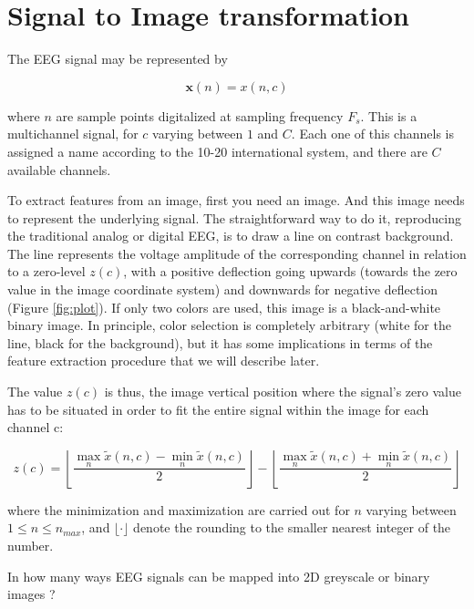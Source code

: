 \section{Signal to Image transformation}

The EEG signal may be represented by

\begin{equation}
\mathbf{x}(n) = x(n,c)
\label{eq:zerolevel}
\end{equation}

\noindent where $n$ are sample points digitalized at sampling frequency $F_s$.  This is a multichannel signal, for $c$ varying between $1$ and $C$.  Each one of this channels is assigned a name according to the 10-20 international system, and there are $C$ available channels.
 
To extract features from an image, first you need an image.  And this image needs to represent the underlying signal.  The straightforward way to do it, reproducing the traditional analog or digital EEG, is to draw a line on contrast background.  The line represents the voltage amplitude of the corresponding channel in relation to a zero-level $z(c)$, with a positive deflection going upwards (towards the zero value in the image coordinate system) and downwards for negative deflection (Figure \ref{fig:plot}).  If only two colors are used, this image is a black-and-white binary image.  In principle, color selection is completely arbitrary (white for the line, black for the background), but it has some implications in terms of the feature extraction procedure that we will describe later.

The value $z(c)$ is thus, the image vertical position where the signal's zero value has to be situated in order to fit the entire signal within the image for each channel c:

\begin{equation}
z(c) = \left \lfloor{ \frac{\max_{n} \tilde{x}(n,c)  - \min_{n} \tilde{x}(n,c) }{2} }\right \rfloor -   \left \lfloor{ \frac{\max_{n} \tilde{x}(n,c)  + \min_{n} \tilde{x}(n,c)}{ 2} }\right \rfloor
\label{eq:zerolevel}
\end{equation}

\noindent where the minimization and maximization are carried out for $n$ varying between ${1 \leq n\leq n_{max}}$, and $ \lfloor \cdot  \rfloor $ denote the rounding to the smaller nearest integer of the number.

In how many ways EEG signals can be mapped into 2D greyscale or binary images ?

